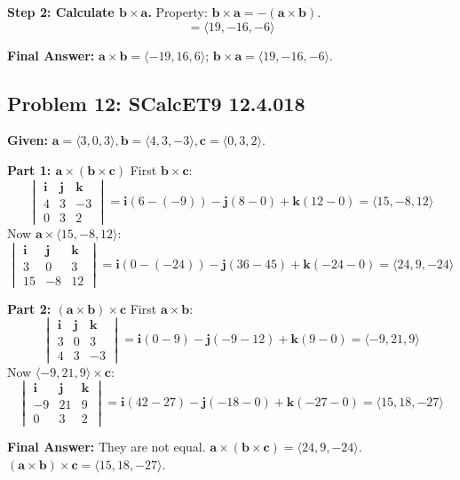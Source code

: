 \documentclass[11pt]{article}
\renewcommand{\vec}[1]{\mathbf{#1}}
\newcommand{\ihat}{\mathbf{i}}
\newcommand{\jhat}{\mathbf{j}}
\newcommand{\khat}{\mathbf{k}}
\begin{document}
\textbf{Step 2: Calculate $\vec{b} \times \vec{a}$.}
Property: $\vec{b} \times \vec{a} = -(\vec{a} \times \vec{b})$.
\[
= \langle 19, -16, -6 \rangle
\]

\textbf{Final Answer:} $\vec{a} \times \vec{b} = \langle -19, 16, 6 \rangle$; $\vec{b} \times \vec{a} = \langle 19, -16, -6 \rangle$.

\hrulefill

\subsection*{Problem 12: SCalcET9 12.4.018}
\textbf{Given:} $\vec{a} = \langle 3, 0, 3 \rangle, \vec{b} = \langle 4, 3, -3 \rangle, \vec{c} = \langle 0, 3, 2 \rangle$.

\textbf{Part 1: $\vec{a} \times (\vec{b} \times \vec{c})$}
First $\vec{b} \times \vec{c}$:
\[
\begin{vmatrix} \ihat & \jhat & \khat \\ 4 & 3 & -3 \\ 0 & 3 & 2 \end{vmatrix} = \ihat(6 - (-9)) - \jhat(8 - 0) + \khat(12 - 0) = \langle 15, -8, 12 \rangle
\]
Now $\vec{a} \times \langle 15, -8, 12 \rangle$:
\[
\begin{vmatrix} \ihat & \jhat & \khat \\ 3 & 0 & 3 \\ 15 & -8 & 12 \end{vmatrix} = \ihat(0 - (-24)) - \jhat(36 - 45) + \khat(-24 - 0) = \langle 24, 9, -24 \rangle
\]

\textbf{Part 2: $(\vec{a} \times \vec{b}) \times \vec{c}$}
First $\vec{a} \times \vec{b}$:
\[
\begin{vmatrix} \ihat & \jhat & \khat \\ 3 & 0 & 3 \\ 4 & 3 & -3 \end{vmatrix} = \ihat(0 - 9) - \jhat(-9 - 12) + \khat(9 - 0) = \langle -9, 21, 9 \rangle
\]
Now $\langle -9, 21, 9 \rangle \times \vec{c}$:
\[
\begin{vmatrix} \ihat & \jhat & \khat \\ -9 & 21 & 9 \\ 0 & 3 & 2 \end{vmatrix} = \ihat(42 - 27) - \jhat(-18 - 0) + \khat(-27 - 0) = \langle 15, 18, -27 \rangle
\]

\textbf{Final Answer:} They are not equal.
$\vec{a} \times (\vec{b} \times \vec{c}) = \langle 24, 9, -24 \rangle$.
$(\vec{a} \times \vec{b}) \times \vec{c} = \langle 15, 18, -27 \rangle$.
\end{document}
